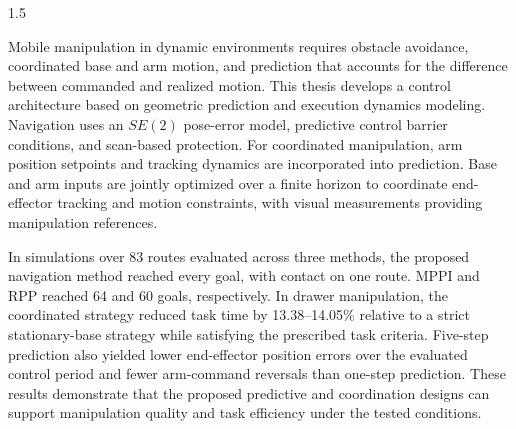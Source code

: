 \begin{abstracten}
\begin{spacing}{1.5}

Mobile manipulation in dynamic environments requires obstacle avoidance, coordinated base and arm motion, and prediction that accounts for the difference between commanded and realized motion. This thesis develops a control architecture based on geometric prediction and execution dynamics modeling. Navigation uses an \(SE(2)\) pose-error model, predictive control barrier conditions, and scan-based protection. For coordinated manipulation, arm position setpoints and tracking dynamics are incorporated into prediction. Base and arm inputs are jointly optimized over a finite horizon to coordinate end-effector tracking and motion constraints, with visual measurements providing manipulation references.

In simulations over 83 routes evaluated across three methods, the proposed navigation method reached every goal, with contact on one route. MPPI and RPP reached 64 and 60 goals, respectively. In drawer manipulation, the coordinated strategy reduced task time by 13.38--14.05\% relative to a strict stationary-base strategy while satisfying the prescribed task criteria. Five-step prediction also yielded lower end-effector position errors over the evaluated control period and fewer arm-command reversals than one-step prediction. These results demonstrate that the proposed predictive and coordination designs can support manipulation quality and task efficiency under the tested conditions.

\end{spacing}
\end{abstracten}
